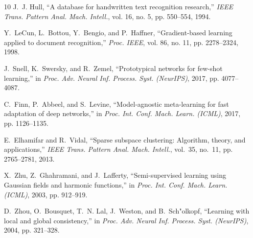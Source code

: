 \documentclass[10pt,comsoc]{IEEEtran}
\begin{document}
\begin{thebibliography}{10}
J.~J. Hull, ``A database for handwritten text recognition research,'' \emph{IEEE Trans. Pattern Anal. Mach. Intell.}, vol. 16, no. 5, pp. 550--554, 1994.

Y.~LeCun, L.~Bottou, Y.~Bengio, and P.~Haffner, ``Gradient-based learning applied to document recognition,'' \emph{Proc. IEEE}, vol. 86, no. 11, pp. 2278--2324, 1998.

J.~Snell, K.~Swersky, and R.~Zemel, ``Prototypical networks for few-shot learning,'' in \emph{Proc. Adv. Neural Inf. Process. Syst. (NeurIPS)}, 2017, pp. 4077--4087.

C.~Finn, P.~Abbeel, and S.~Levine, ``Model-agnostic meta-learning for fast adaptation of deep networks,'' in \emph{Proc. Int. Conf. Mach. Learn. (ICML)}, 2017, pp. 1126--1135.

E.~Elhamifar and R.~Vidal, ``Sparse subspace clustering: Algorithm, theory, and applications,'' \emph{IEEE Trans. Pattern Anal. Mach. Intell.}, vol.~35, no.~11, pp. 2765--2781, 2013.

X.~Zhu, Z.~Ghahramani, and J.~Lafferty, ``Semi-supervised learning using Gaussian fields and harmonic functions,'' in \emph{Proc. Int. Conf. Mach. Learn. (ICML)}, 2003, pp. 912--919.

D.~Zhou, O.~Bousquet, T.~N. Lal, J.~Weston, and B.~Sch{"o}lkopf, ``Learning with local and global consistency,'' in \emph{Proc. Adv. Neural Inf. Process. Syst. (NeurIPS)}, 2004, pp. 321--328.

\end{thebibliography}
\end{document}
